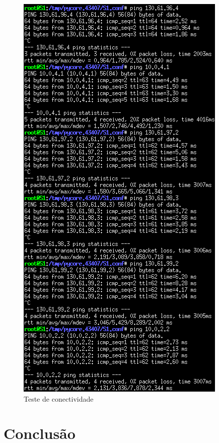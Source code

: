 \documentclass{article}
\begin{document}
\begin{figure}[h]
	\centering
	\includegraphics[scale = 0.4]{teste-conectividade-ex3.png}
	\caption{Teste de conectividade}
\end{figure}

\section{Conclusão}
\end{document}
